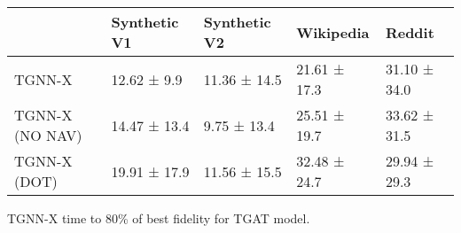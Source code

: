\begin{tabular}{lllll}
\toprule
 & Synthetic V1 & Synthetic V2 & Wikipedia & Reddit \\
\midrule
TGNN-X & 12.62 ± 9.9 & 11.36 ± 14.5 & 21.61 ± 17.3 & 31.10 ± 34.0 \\
TGNN-X (NO NAV) & 14.47 ± 13.4 & 9.75 ± 13.4 & 25.51 ± 19.7 & 33.62 ± 31.5 \\
TGNN-X (DOT) & 19.91 ± 17.9 & 11.56 ± 15.5 & 32.48 ± 24.7 & 29.94 ± 29.3 \\
\bottomrule
\end{tabular}
\caption{\label{tab:tgat_time}TGNN-X time to 80\% of best fidelity for TGAT model.}

